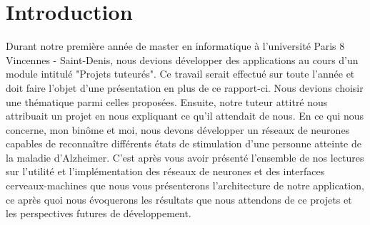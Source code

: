 \part*{Introduction}

 Durant notre première année de master en informatique à l'université Paris 8 Vincennes - Saint-Denis, nous devions développer des applications au cours d'un module intitulé "Projets tuteurés".
 Ce travail serait effectué sur toute l'année et doit faire l'objet d'une présentation en plus de ce rapport-ci. Nous devions choisir une thématique parmi celles proposées.
 Ensuite, notre tuteur attitré nous attribuait un projet en nous expliquant ce qu'il attendait de nous. En ce qui nous concerne, mon binôme et moi, nous devons développer un réseaux de neurones capables de reconnaître différents états de stimulation d'une personne atteinte de la maladie d'Alzheimer.
 C'est après vous avoir présenté l'ensemble de nos lectures sur l'utilité et l'implémentation des réseaux de neurones et des interfaces cerveaux-machines que nous vous présenterons l'architecture de notre application, ce après quoi nous évoquerons les résultats que nous attendons de ce projets et les perspectives futures de développement.